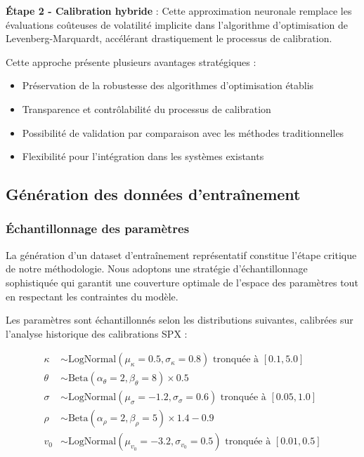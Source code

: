\textbf{Étape 2 - Calibration hybride} : Cette approximation neuronale remplace les évaluations coûteuses de volatilité implicite dans l'algorithme d'optimisation de Levenberg-Marquardt, accélérant drastiquement le processus de calibration.

Cette approche présente plusieurs avantages stratégiques :
\begin{itemize}
\item Préservation de la robustesse des algorithmes d'optimisation établis
\item Transparence et contrôlabilité du processus de calibration
\item Possibilité de validation par comparaison avec les méthodes traditionnelles
\item Flexibilité pour l'intégration dans les systèmes existants
\end{itemize}

\subsection{Génération des données d'entraînement}

\subsubsection{Échantillonnage des paramètres}

La génération d'un dataset d'entraînement représentatif constitue l'étape critique de notre méthodologie. Nous adoptons une stratégie d'échantillonnage sophistiquée qui garantit une couverture optimale de l'espace des paramètres tout en respectant les contraintes du modèle.

Les paramètres sont échantillonnés selon les distributions suivantes, calibrées sur l'analyse historique des calibrations SPX :

\begin{align}
\kappa &\sim \text{LogNormal}(\mu_\kappa = 0.5, \sigma_\kappa = 0.8) \text{ tronquée à } [0.1, 5.0] \\
\theta &\sim \text{Beta}(\alpha_\theta = 2, \beta_\theta = 8) \times 0.5 \\
\sigma &\sim \text{LogNormal}(\mu_\sigma = -1.2, \sigma_\sigma = 0.6) \text{ tronquée à } [0.05, 1.0] \\
\rho &\sim \text{Beta}(\alpha_\rho = 2, \beta_\rho = 5) \times 1.4 - 0.9 \\
v_0 &\sim \text{LogNormal}(\mu_{v_0} = -3.2, \sigma_{v_0} = 0.5) \text{ tronquée à } [0.01, 0.5]
\end{align}

